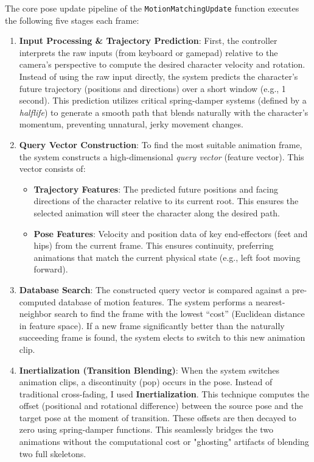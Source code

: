 \documentclass[8pt,a4paper]{extarticle}
\begin{document}
The core pose update pipeline of the \texttt{MotionMatchingUpdate} function executes the following five stages each frame:

\begin{enumerate}
    \item \textbf{Input Processing \& Trajectory Prediction}:
          First, the controller interprets the raw inputs (from keyboard or gamepad) relative to the camera's perspective to compute the desired character velocity and rotation. Instead of using the raw input directly, the system predicts the character's future trajectory (positions and directions) over a short window (e.g., 1 second). This prediction utilizes critical spring-damper systems (defined by a \textit{halflife}) to generate a smooth path that blends naturally with the character's momentum, preventing unnatural, jerky movement changes.

    \item \textbf{Query Vector Construction}:
          To find the most suitable animation frame, the system constructs a high-dimensional \textit{query vector} (feature vector). This vector consists of:
          \begin{itemize}
              \item \textbf{Trajectory Features}: The predicted future positions and facing directions of the character relative to its current root. This ensures the selected animation will steer the character along the desired path.
              \item \textbf{Pose Features}: Velocity and position data of key end-effectors (feet and hips) from the current frame. This ensures continuity, preferring animations that match the current physical state (e.g., left foot moving forward).
          \end{itemize}

    \item \textbf{Database Search}:
          The constructed query vector is compared against a pre-computed database of motion features. The system performs a nearest-neighbor search to find the frame with the lowest ``cost'' (Euclidean distance in feature space). If a new frame significantly better than the naturally succeeding frame is found, the system elects to switch to this new animation clip.

    \item \textbf{Inertialization (Transition Blending)}:
          When the system switches animation clips, a discontinuity (pop) occurs in the pose. Instead of traditional cross-fading, I used \textbf{Inertialization}. This technique computes the offset (positional and rotational difference) between the source pose and the target pose at the moment of transition. These offsets are then decayed to zero using spring-damper functions. This seamlessly bridges the two animations without the computational cost or "ghosting" artifacts of blending two full skeletons.


\end{enumerate}
\end{document}
